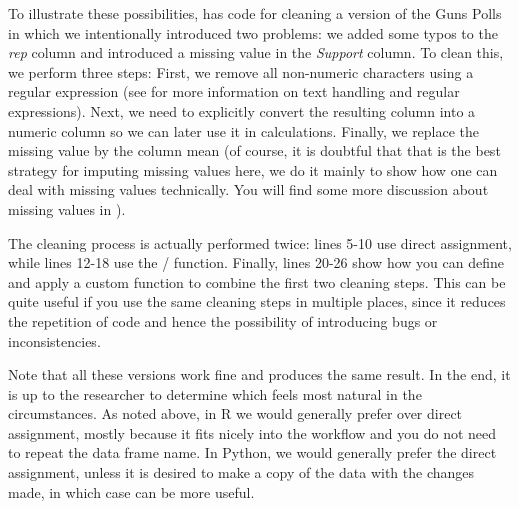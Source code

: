 

To illustrate these possibilities,  has code for cleaning a version of the Guns Polls
in which we intentionally introduced two problems: we added some typos to the \emph{rep} column
and introduced a missing value in the \emph{Support} column.
To clean this, we perform three steps: First, we remove all non-numeric characters using a regular expression
(see  for more information on text handling and regular expressions).
Next, we need to explicitly convert the resulting column into a numeric column so we can later use it in calculations.
Finally, we replace the missing value by the column mean
(of course, it is doubtful that that is the best strategy for imputing missing values here,
we do it mainly to show how one can deal with missing values technically. You will find some more discussion about missing values in ).

The cleaning process is actually performed twice: lines 5-10 use direct assignment,
while lines 12-18 use the / function.
Finally, lines 20-26 show how you can define and apply a custom function to combine the first two cleaning steps.
This can be quite useful if you use the same cleaning steps in multiple places,
since it reduces the repetition of code and hence the possibility of introducing bugs or inconsistencies. 

Note that all these versions work fine and produces the same result.
In the end, it is up to the researcher to determine which feels most natural in the circumstances.
As noted above, in R we would generally prefer  over direct assignment,
mostly because it fits nicely into the  workflow and you do not need to repeat the data frame name.
In Python, we would generally prefer the direct assignment, unless it is desired to make a copy of the data
with the changes made, in which case  can be more useful. 



